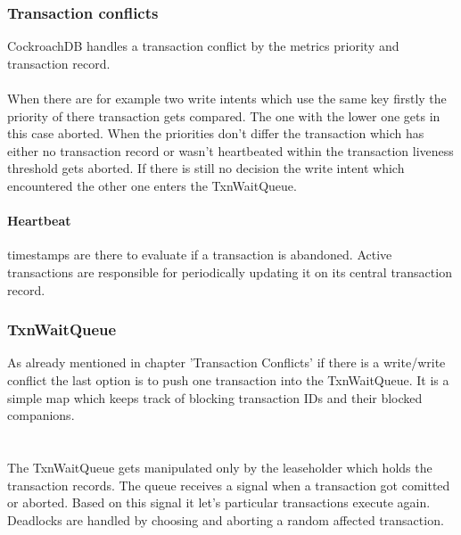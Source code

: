 \subsubsection{Transaction conflicts}
CockroachDB handles a transaction conflict by the metrics priority and transaction record.\\\\
When there are for example two write intents which use the same key firstly the priority of there transaction gets compared.
The one with the lower one gets in this case aborted. When the priorities don't differ the transaction which has either no
transaction record or wasn't heartbeated within the transaction liveness threshold gets aborted. If there is still no
decision the write intent which encountered the other one enters the TxnWaitQueue.

\paragraph{Heartbeat} timestamps are there to evaluate if a transaction is abandoned. Active transactions are 
responsible for periodically updating it on its central transaction record. 

\subsubsection{TxnWaitQueue}
As already mentioned in chapter 'Transaction Conflicts' if there is a write/write conflict the last option is to push one
transaction into the TxnWaitQueue. It is a simple map which keeps track of blocking transaction IDs and their blocked 
companions.\\
\\
\\The TxnWaitQueue gets manipulated only by the leaseholder which holds the transaction 
records. The queue receives a signal when a transaction got comitted or aborted. Based on this signal it let's particular
transactions execute again.\\
Deadlocks are handled by choosing and aborting a random affected transaction.

